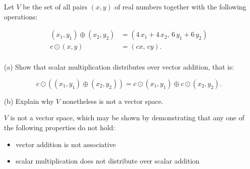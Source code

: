 
\begin{exerciseStatement}


 Let \(V\) be the set of all pairs \((x,y)\) of real numbers together with the following operations: 


\begin{align*} (x_1,y_1)\oplus (x_2,y_2)&= \left(4 \, x_{1} + 4 \, x_{2},\,6 \, y_{1} + 6 \, y_{2}\right)  \\c \odot (x,y) &= \left(c x,\,c y\right) . \\ \end{align*}
            

 (a) Show that scalar multiplication distributes over vector addition, that is: 

\[c\odot \left((x_1,y_1)\oplus(x_2,y_2)\right)=c\odot(x_1,y_1)\oplus c\odot(x_2,y_2).
    \]

 (b) Explain why \(V\) nonetheless is not a vector space. 


\end{exerciseStatement}
    
\begin{exerciseAnswer} 


\(V\) is not a vector space, which may be shown by demonstrating that any one of the following properties do not hold: 


\begin{itemize}
\item vector addition is not associative
\item scalar multiplication does not distribute over scalar addition
\end{itemize}
    
\end{exerciseAnswer}
    
